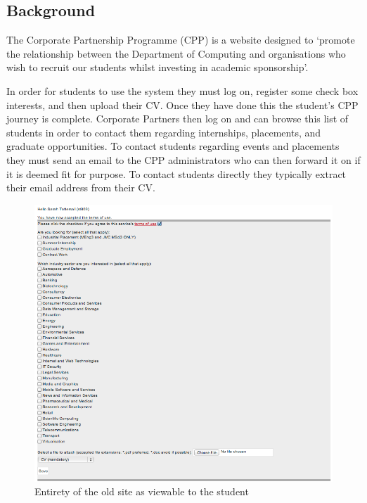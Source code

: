 \subsection{Background}
The Corporate Partnership Programme (CPP) is a website designed to `promote the relationship between the Department of Computing and organisations who wish to recruit our students whilst investing in academic sponsorship'\cite{doc-cpp}.

In order for students to use the system they must log on, register some check box interests, and then upload their CV.
Once they have done this the student's CPP journey is complete.
Corporate Partners then log on and can browse this list of students in order to contact them regarding internships, placements, and graduate opportunities. To contact students regarding events and placements they must send an email to the CPP administrators who can then forward it on if it is deemed fit for purpose. To contact students directly they typically extract their email address from their CV.

\begin{figure}[H]\centering
\includegraphics[scale=0.5]{images/introduction/old_cpp}
\caption{Entirety of the old site as viewable to the student}
\end{figure}
